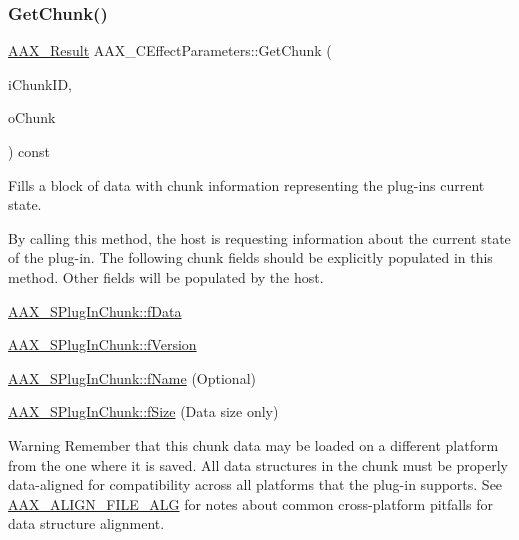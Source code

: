 \subsubsection{\texorpdfstring{GetChunk()}{GetChunk()}}
{\footnotesize\ttfamily \mbox{\hyperlink{a00392_a4d8f69a697df7f70c3a8e9b8ee130d2f}{A\+A\+X\+\_\+\+Result}} A\+A\+X\+\_\+\+C\+Effect\+Parameters\+::\+Get\+Chunk (\begin{DoxyParamCaption}\item[{\mbox{\hyperlink{a00392_ac678f9c1fbcc26315d209f71a147a175}{A\+A\+X\+\_\+\+C\+Type\+ID}}}]{i\+Chunk\+ID,  }\item[{\mbox{\hyperlink{a01421}{A\+A\+X\+\_\+\+S\+Plug\+In\+Chunk}} $\ast$}]{o\+Chunk }\end{DoxyParamCaption}) const\hspace{0.3cm}{\ttfamily [virtual]}}



Fills a block of data with chunk information representing the plug-\/in\textquotesingle{}s current state. 

By calling this method, the host is requesting information about the current state of the plug-\/in. The following chunk fields should be explicitly populated in this method. Other fields will be populated by the host.

\begin{DoxyItemize}
\item \mbox{\hyperlink{a01421_abc76d66fffa4a59ee5cfdbdd992c532c}{A\+A\+X\+\_\+\+S\+Plug\+In\+Chunk\+::f\+Data}} \item \mbox{\hyperlink{a01421_ac114fd94e7b12c235f9c18bcbbc46f06}{A\+A\+X\+\_\+\+S\+Plug\+In\+Chunk\+::f\+Version}} \item \mbox{\hyperlink{a01421_a1b07e29358b5549739f674e04653a6bc}{A\+A\+X\+\_\+\+S\+Plug\+In\+Chunk\+::f\+Name}} (Optional) \item \mbox{\hyperlink{a01421_ac08f37f1ed50eac8ac3ca4bf5494c84d}{A\+A\+X\+\_\+\+S\+Plug\+In\+Chunk\+::f\+Size}} (Data size only)\end{DoxyItemize}
\begin{DoxyWarning}{Warning}
Remember that this chunk data may be loaded on a different platform from the one where it is saved. All data structures in the chunk must be properly data-\/aligned for compatibility across all platforms that the plug-\/in supports. See \mbox{\hyperlink{a00392_a8fbeac3c5db5ac694e85a021ed74dc9e}{A\+A\+X\+\_\+\+A\+L\+I\+G\+N\+\_\+\+F\+I\+L\+E\+\_\+\+A\+LG}} for notes about common cross-\/platform pitfalls for data structure alignment.
\end{DoxyWarning}

